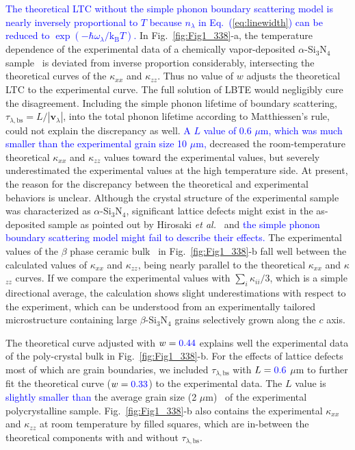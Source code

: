 \documentclass[twocolumn,amsmath,amssymb,a4paper,prb,superscriptaddress,floatfix]{revtex4-1}
\begin{document}
\textcolor {blue}{The theoretical LTC without the simple phonon boundary
scattering model is nearly inversely proportional to $T$ because $n_\lambda$
in Eq.~(\ref{eq:linewidth}) can be reduced to $\exp(-\hbar\omega_\lambda/\mathrm{k_B}T)$.} In
Fig.~\ref{fig:Fig1_338}-a, the
temperature dependence of the experimental data of a chemically vapor-deposited
$\alpha$-Si$_3$N$_4$ sample~\cite{hirai} is deviated from inverse proportion
considerably, intersecting the theoretical curves of the $\kappa$$_{xx}$ and
$\kappa$$_{zz}$.  Thus no value of $w$ adjusts the theoretical LTC to the
experimental curve.  The full solution of LBTE would negligibly cure the
disagreement.  Including the simple phonon lifetime of boundary scattering,
$\tau_{\lambda,\text{bs}}=L/|\mathbf{v}_\lambda|$, into the total phonon
lifetime according to Matthiessen's rule, could not explain the discrepancy as
well.  \textcolor {blue}{A $L$ value of 0.6 $\mu\text{m}$, which was much
smaller than the experimental grain size 10 $\mu\text{m}$,} decreased the
room-temperature theoretical $\kappa$$_{xx}$ and $\kappa$$_{zz}$ values toward
the experimental values, but severely underestimated the experimental values at
the high temperature side.  At present, the reason for the discrepancy between
the theoretical and experimental behaviors is unclear.  Although the crystal
structure of the experimental sample was characterized as $\alpha$-Si$_3$N$_4$,
significant lattice defects might exist in the as-deposited sample as pointed
out by Hirosaki {\it et al.}~\cite{hirosaki-md} and \textcolor{blue}{the simple
phonon boundary scattering model might fail to describe their effects.} The
experimental values of the $\beta$ phase ceramic bulk~\cite{hirosaki} in
Fig.~\ref{fig:Fig1_338}-b fall well between the calculated values of
$\kappa$$_{xx}$ and  $\kappa$$_{zz}$, being nearly parallel to the theoretical
$\kappa$$_{xx}$ and  $\kappa$$_{zz}$ curves.  If we compare the experimental
values with $\sum_i \kappa_{ii}/3$, which is a simple directional average, the
calculation shows slight underestimations with respect to the experiment, which
can be understood from an experimentally tailored microstructure containing
large $\beta$-Si$_3$N$_4$ grains selectively grown along the $c$
axis.~\cite{hirosaki}

The theoretical curve adjusted with $w=\textcolor{blue}{0.44}$ explains well the experimental
data of the poly-crystal bulk in Fig.~\ref{fig:Fig1_338}-b.  For the effects of
lattice defects most of which are grain boundaries, we included
$\tau_{\lambda,\text{bs}}$ with $L = \textcolor{blue}{0.6}$ $\mu\text{m}$ to further fit the
theoretical curve ($w=\textcolor{blue}{0.33}$) to the experimental data.  The $L$ value is
\textcolor{blue}{slightly smaller than} the average grain size (2 $\mu\text{m}$)~\cite{hirosaki} of the
experimental polycrystalline sample.  Fig.~\ref{fig:Fig1_338}-b also contains
the experimental $\kappa$$_{xx}$ and $\kappa$$_{zz}$ at room temperature by
filled squares, which are in-between the theoretical components with and
without $\tau_{\lambda,\text{bs}}$. 
\end{document}
